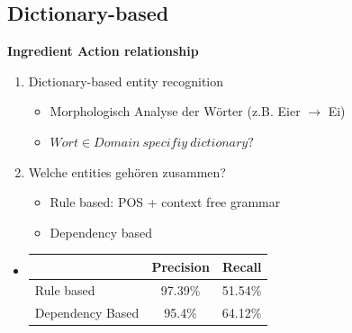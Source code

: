 \documentclass[12pt]{beamer}
\newcommand{\myCite}[1]{{\scriptsize\parencite{#1}}}
\begin{document}
\subsection{Dictionary-based}
\begin{frame}
	\begin{center}
		\textbf{Ingredient Action relationship} \\
		\myCite{GrammaBased}
	\end{center}
		
	\begin{enumerate}
		\item Dictionary-based entity recognition
		\begin{itemize}
			\item Morphologisch Analyse der Wörter (z.B. Eier $\rightarrow$ Ei)
			\item $Wort \in Domain\ specifiy\ dictionary?$
		\end{itemize}
		
		\item Welche entities gehören zusammen?
		\begin{itemize}
			\item Rule based: POS + context free grammar
			\item Dependency based
		\end{itemize}
	\end{enumerate}
	
	\begin{itemize}
	 \item \hspace{-2cm} \begin{table}[H] \vspace{-1cm}
		\centering
		\begin{tabular}{ l | c | r } 
			& Precision & Recall \\
			\hline
			Rule based & 97.39\% & 51.54\% \\
			Dependency Based & 95.4\% & 64.12\% \\
		\end{tabular}
	\end{table}
	\end{itemize}
\end{frame}
\end{document}
